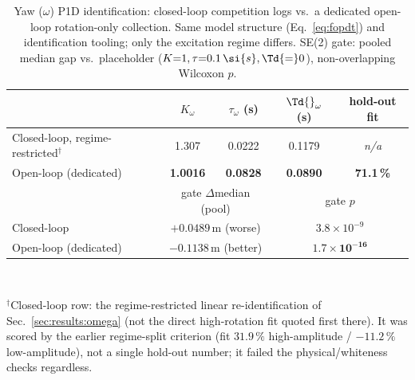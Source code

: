 \begin{table}[t]
  \caption{Yaw (\(\omega\)) P1D identification: closed-loop competition logs
  vs.\ a dedicated open-loop rotation-only collection. Same model structure
  (Eq.~\ref{eq:fopdt}) and identification tooling; only the excitation regime
  differs. SE(2) gate: pooled median gap vs.\ placeholder
  ($K{=}1,\tau{=}0.1\,\si{s},\Td{=}0$), non-overlapping Wilcoxon $p$.}
  \label{tab:omega-regime}
  \centering
  \begin{tabular}{lcccc}
    \toprule
     & $K_\omega$ & $\tau_\omega$ (s) & $\Td{}_\omega$ (s) & hold-out fit \\
    \midrule
    Closed-loop, regime-restricted$^\dagger$ & 1.307  & 0.0222 & 0.1179 & \emph{n/a} \\
    Open-loop (dedicated) & \textbf{1.0016} & \textbf{0.0828} & \textbf{0.0890} & \textbf{71.1\,\%} \\
    \midrule
     & \multicolumn{2}{c}{gate $\Delta$median (pool)} & \multicolumn{2}{c}{gate $p$} \\
    \midrule
    Closed-loop  & \multicolumn{2}{c}{$+0.0489$\,m (worse)} & \multicolumn{2}{c}{$3.8\times10^{-9}$} \\
    Open-loop (dedicated) & \multicolumn{2}{c}{$\mathbf{-0.1138}$\,m (better)} & \multicolumn{2}{c}{$\mathbf{1.7\times10^{-16}}$} \\
    \bottomrule
  \end{tabular}
  \\[2pt]
  \raggedright\footnotesize $^\dagger$Closed-loop row: the regime-restricted
  linear re-identification of Sec.~\ref{sec:results:omega} (not the direct
  high-rotation fit quoted first there). It was scored by the earlier
  regime-split criterion (fit $31.9\,\%$ high-amplitude / $-11.2\,\%$
  low-amplitude), not a single hold-out number; it failed the
  physical/whiteness checks regardless.
\end{table}
